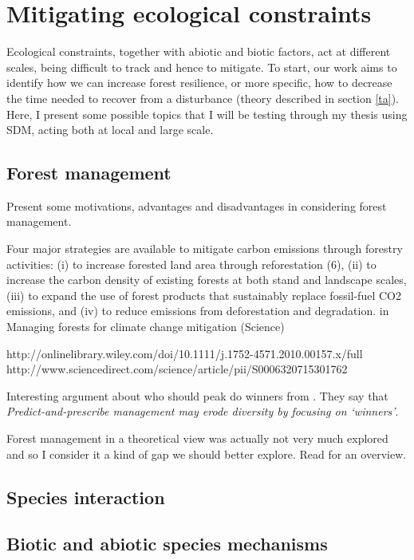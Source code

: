 \section{Mitigating ecological constraints}

Ecological constraints, together with abiotic and biotic factors, act at different scales, being difficult to track and hence to mitigate.
To start, our work aims to identify how we can increase forest resilience, or more specific, how to decrease the time needed to recover from a disturbance (theory described in section \ref{ta}).
Here, I present some possible topics that I will be testing through my thesis using SDM, acting both at local and large scale.

\subsection*{Forest management}

Present some motivations, advantages and disadvantages in considering forest management.

Four major strategies are available to mitigate carbon emissions through forestry activities: (i) to increase forested land area through reforestation (6), (ii) to increase the carbon density of existing forests at both stand and landscape scales, (iii) to expand the use of forest products that sustainably replace fossil-fuel CO2 emissions, and (iv) to reduce emissions from deforestation and degradation. in Managing forests for climate change mitigation (Science)

http://onlinelibrary.wiley.com/doi/10.1111/j.1752-4571.2010.00157.x/full
http://www.sciencedirect.com/science/article/pii/S0006320715301762

Interesting argument about who should peak do winners from \citet{Webster2017}. They say that \textit{Predict-and-prescribe management may erode diversity by focusing on ‘winners’}.

Forest management in a theoretical view was actually not very much explored and so I consider it a kind of gap we should better explore. Read \citet{Becknell2015} for an overview.

\subsection*{Species interaction}

\subsection*{Biotic and abiotic species mechanisms}

